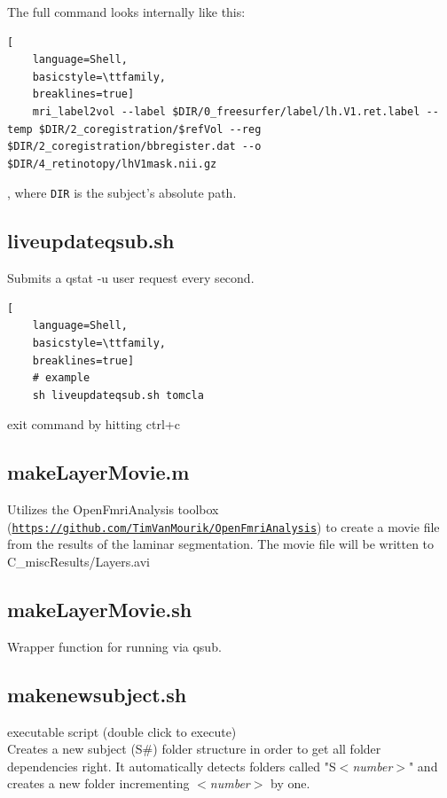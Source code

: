 \documentclass[12pt,a4paper]{scrartcl}
\begin{document}
The full command looks internally like this:
\begin{lstlisting}[
    language=Shell,
    basicstyle=\ttfamily,
    breaklines=true]
    mri_label2vol --label $DIR/0_freesurfer/label/lh.V1.ret.label --temp $DIR/2_coregistration/$refVol --reg $DIR/2_coregistration/bbregister.dat --o $DIR/4_retinotopy/lhV1mask.nii.gz
\end{lstlisting}
, where \texttt{DIR} is the subject's absolute path.\\

\subsection{liveupdateqsub.sh}
\label{sh:liveupdate}
Submits a qstat -u user request every second.
\begin{lstlisting}[
    language=Shell,
    basicstyle=\ttfamily,
    breaklines=true]
    # example
    sh liveupdateqsub.sh tomcla
\end{lstlisting}

\noindent exit command by hitting ctrl+c\\

\subsection{makeLayerMovie.m}
\label{m:makeMov}
Utilizes the OpenFmriAnalysis toolbox (\href{https://github.com/TimVanMourik/OpenFmriAnalysis}{\nolinkurl{https://github.com/TimVanMourik/OpenFmriAnalysis}}) to create a movie file from the results of the laminar segmentation. The movie file will be written to C\_miscResults/Layers.avi\\

\subsection{makeLayerMovie.sh}
\label{sh:makeMov}
Wrapper function for running \texttt{} via qsub.\\

\subsection{makenewsubject.sh}
\label{sh:newS}
executable script (double click to execute)\\

Creates a new subject (S\#) folder structure in order to get all folder dependencies right. It automatically detects folders called "S\textit{$<$number$>$}" and creates a new folder incrementing \textit{$<$number$>$} by one.\\
\end{document}
